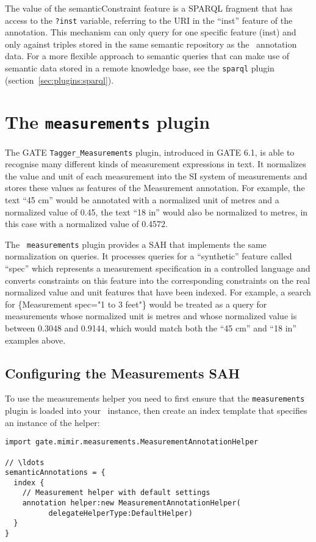The value of the semanticConstraint feature is a SPARQL fragment that has
access to the {\tt ?inst} variable, referring to the URI in the ``inst''
feature of the annotation.  This mechanism can only query for one specific
feature (inst) and only against triples stored in the same semantic repository
as the \Mimir\ annotation data.  For a more flexible approach to semantic
queries that can make use of semantic data stored in a remote knowledge base,
see the {\tt sparql} plugin (section~\ref{sec:plugins:sparql}).

\section{The {\tt measurements} plugin}\label{sec:plugins:measurements}

The GATE {\tt Tagger\_Measurements} plugin, introduced in GATE 6.1, is able to
recognise many different kinds of measurement expressions in text.  It
normalizes the value and unit of each measurement into the SI system of
measurements and stores these values as features of the Measurement annotation.
For example, the text ``45 cm'' would be annotated with a normalized unit of
metres and a normalized value of 0.45, the text ``18 in'' would also be
normalized to metres, in this case with a normalized value of 0.4572.

The \Mimir\ {\tt measurements} plugin provides a SAH that implements the same
normalization on queries.  It processes queries for a ``synthetic'' feature
called ``spec'' which represents a measurement specification in a controlled
language and converts constraints on this feature into the corresponding
constraints on the real normalized value and unit features that have been
indexed.  For example, a search for \{Measurement spec="1 to 3 feet"\} would be
treated as a query for measurements whose normalized unit is metres and whose
normalized value is between 0.3048 and 0.9144, which would match both the ``45
cm'' and ``18 in'' examples above.

\subsection{Configuring the Measurements SAH}

To use the measurements helper you need to first ensure that the
{\tt measurements} plugin is loaded into your \Mimir\ instance, then create an
index template that specifies an instance of the helper:
\begin{lstlisting}[texcl]
import gate.mimir.measurements.MeasurementAnnotationHelper

// \ldots
semanticAnnotations = {
  index {
    // Measurement helper with default settings
    annotation helper:new MeasurementAnnotationHelper(
          delegateHelperType:DefaultHelper)
  }
}
\end{lstlisting}

